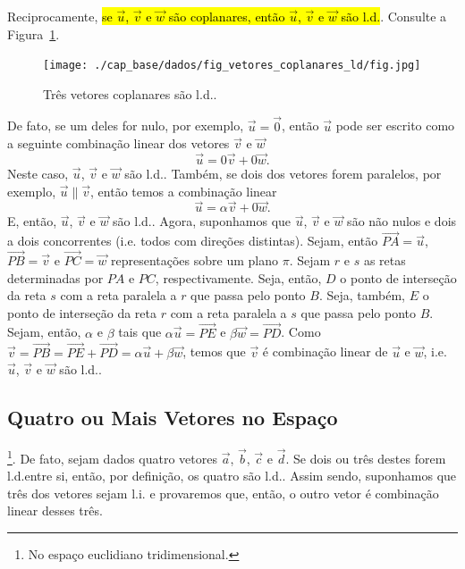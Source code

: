 Reciprocamente, \hl{se $\vec{u}$, $\vec{v}$ e $\vec{w}$ são coplanares, então $\vec{u}$, $\vec{v}$ e $\vec{w}$ são l.d.}. Consulte a Figura~\ref{cap_base_sec_deplinear:fig:vetores_coplanares_ld}.

\begin{figure}[h]
  \centering
  \texttt{[image: ./cap\_base/dados/fig\_vetores\_coplanares\_ld/fig.jpg]}
  \caption{Três vetores coplanares são l.d..}
  \label{cap_base_sec_deplinear:fig:vetores_coplanares_ld}
\end{figure}

De fato, se um deles for nulo, por exemplo, $\vec{u}=\vec{0}$, então $\vec{u}$ pode ser escrito como a seguinte combinação linear dos vetores $\vec{v}$ e $\vec{w}$
\begin{equation}
  \vec{u} = 0\vec{v} + 0\vec{w}.
\end{equation}
Neste caso, $\vec{u}$, $\vec{v}$ e $\vec{w}$ são l.d.. Também, se dois dos vetores forem paralelos, por exemplo, $\vec{u}\parallel\vec{v}$, então temos a combinação linear
\begin{equation}
  \vec{u} = \alpha\vec{v} + 0\vec{w}.
\end{equation}
E, então, $\vec{u}$, $\vec{v}$ e $\vec{w}$ são l.d.. Agora, suponhamos que $\vec{u}$, $\vec{v}$ e $\vec{w}$ são não nulos e dois a dois concorrentes (i.e. todos com direções distintas). Sejam, então $\overrightarrow{PA}=\vec{u}$, $\overrightarrow{PB}=\vec{v}$ e $\overrightarrow{PC}=\vec{w}$ representações sobre um plano $\pi$. Sejam $r$ e $s$ as retas determinadas por $PA$ e $PC$, respectivamente. Seja, então, $D$ o ponto de interseção da reta $s$ com a reta paralela a $r$ que passa pelo ponto $B$. Seja, também, $E$ o ponto de interseção da reta $r$ com a reta paralela a $s$ que passa pelo ponto $B$. Sejam, então, $\alpha$ e $\beta$ tais que $\alpha\vec{u}=\overrightarrow{PE}$ e $\beta\vec{w}=\overrightarrow{PD}$. Como $\vec{v} = \overrightarrow{PB} = \overrightarrow{PE} + \overrightarrow{PD} = \alpha\vec{u}+\beta\vec{w}$, temos que $\vec{v}$ é combinação linear de $\vec{u}$ e $\vec{w}$, i.e. $\vec{u}$, $\vec{v}$ e $\vec{w}$ são l.d..

\subsection{Quatro ou Mais Vetores no Espaço}\label{cap_base_sec_deplinear:subsec:4vec}

\footnote{No espaço euclidiano tridimensional.}. De fato, sejam dados quatro vetores $\vec{a}$, $\vec{b}$, $\vec{c}$ e $\vec{d}$. Se dois ou três destes forem l.d.entre si, então, por definição, os quatro são l.d.. Assim sendo, suponhamos que três dos vetores sejam l.i. e provaremos que, então, o outro vetor é combinação linear desses três.

